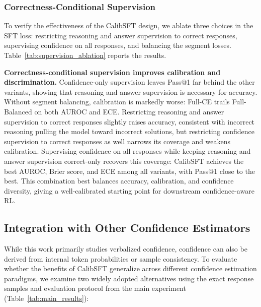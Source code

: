 \documentclass{article} %
\begin{document}


\subsubsection{Correctness-Conditional Supervision}
To verify the effectiveness of the CalibSFT design, we ablate three choices in
the SFT loss: restricting reasoning and answer supervision to correct
responses, supervising confidence on all responses, and balancing the
segment losses. Table~\ref{tab:supervision_ablation} reports the results.

\noindent\textbf{Correctness-conditional supervision improves calibration and discrimination.}
Confidence-only supervision leaves Pass@1 far behind the other variants,
showing that reasoning and answer supervision is necessary for accuracy.
Without segment balancing, calibration is markedly worse: Full-CE trails
Full-Balanced on both AUROC and ECE. Restricting
reasoning and answer supervision to correct responses slightly raises
accuracy, consistent with incorrect reasoning pulling the model toward
incorrect solutions, but restricting confidence supervision to correct
responses as well narrows its coverage and weakens calibration.
Supervising confidence on all responses while keeping reasoning and
answer supervision correct-only recovers this coverage: CalibSFT
achieves the best AUROC, Brier score, and ECE among all variants, with
Pass@1 close to the best. This combination best balances accuracy,
calibration, and confidence diversity, giving a well-calibrated starting point for downstream
confidence-aware RL.

\subsection{Integration with Other Confidence Estimators}
\label{sec:confidence_estimators}
While this work primarily studies verbalized confidence, 
confidence can also be derived from internal token probabilities or sample consistency. 
To evaluate whether the benefits of CalibSFT generalize across different confidence estimation paradigms, 
we examine two widely adopted alternatives using the exact response samples and evaluation protocol from the main experiment (Table~\ref{tab:main_results}):
\end{document}

